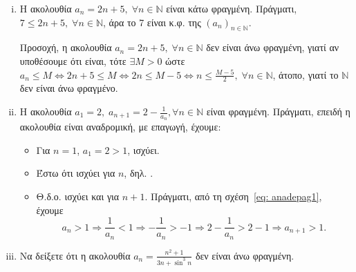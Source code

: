 \documentclass[main.tex]{subfiles}
\begin{document}
\begin{examples}
\begin{enumerate}[i)]
    \item Η ακολουθία $ a_{n}= 2n+5, \; \forall n \in \mathbb{N} $ είναι κάτω 
      φραγμένη.
      Πράγματι, $ 7 \leq 2n+5, \; \forall n \in \mathbb{N} $, άρα το 
      7 είναι κ.φ. της $ (a_{n} )_{n \in \mathbb{N}} $.

      Προσοχή, η ακολουθία $ a_{n}= 2n+5, \; \forall n \in \mathbb{N} $ δεν είναι 
      άνω φραγμένη, γιατί αν υποθέσουμε ότι είναι, τότε $ \exists M>0 $ ώστε 
      $ a_{n} \leq M \Leftrightarrow 2n+5 \leq M \Leftrightarrow 2n \leq M-5
      \Leftrightarrow n \leq \frac{M-5}{2}, \; \forall n \in \mathbb{N} $, άτοπο, 
      γιατί το $ \mathbb{N} $ δεν είναι άνω φραγμένο.

    \item Η ακολουθία $ a_{1}=2, \; a_{n+1}=2 - \frac{1}{a_{n}}, \forall n \in 
      \mathbb{N}$
      είναι φραγμένη. Πράγματι, επειδή η ακολουθία είναι αναδρομική, 
      με επαγωγή, έχουμε:
      \begin{itemize}
        \item Για $ n=1 $, $ a_{1}=2>1 $, ισχύει. 
        \item Έστω ότι ισχύει για $n$, δηλ. .
        \item Θ.δ.ο. ισχύει και για $ n+1 $. Πράγματι, από τη 
          σχέση~\eqref{eq: anadepag1}, έχουμε
          \[
            a_{n}>1 \Rightarrow \frac{1}{a_{n}} 
            < 1 \Rightarrow - \frac{1}{a_{n}} > 
            -1 \Rightarrow 2 - \frac{1}{a_{n}} 
            > 2-1 \Rightarrow a_{n+1} > 1.
          \] 
      \end{itemize}

    \item Να δείξετε ότι η ακολουθία $ a_{n} = 
      \frac{n^{2}+1}{3n+ \sin^{3}{n}} $ δεν είναι άνω φραγμένη. 


\end{enumerate}
\end{examples}
\end{document}
